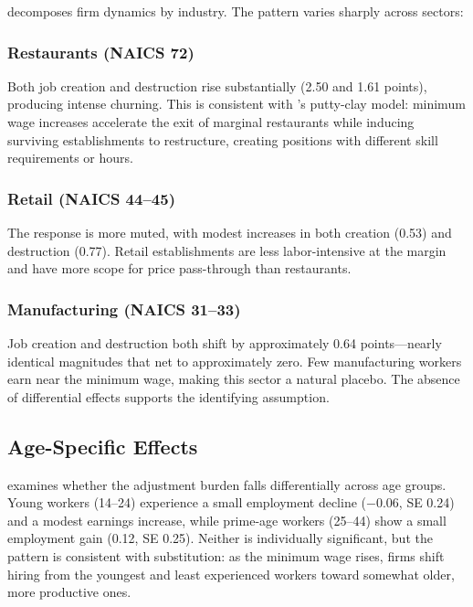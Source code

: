 \documentclass[12pt]{article}
\begin{document}


 decomposes firm dynamics by industry. The pattern varies sharply across sectors:

\subsubsection*{Restaurants (NAICS 72)} Both job creation and destruction rise substantially (2.50 and 1.61 points), producing intense churning. This is consistent with \citet{aaronson2018industry}'s putty-clay model: minimum wage increases accelerate the exit of marginal restaurants while inducing surviving establishments to restructure, creating positions with different skill requirements or hours.

\subsubsection*{Retail (NAICS 44--45)} The response is more muted, with modest increases in both creation (0.53) and destruction (0.77). Retail establishments are less labor-intensive at the margin and have more scope for price pass-through than restaurants.

\subsubsection*{Manufacturing (NAICS 31--33)} Job creation and destruction both shift by approximately 0.64 points---nearly identical magnitudes that net to approximately zero. Few manufacturing workers earn near the minimum wage, making this sector a natural placebo. The absence of differential effects supports the identifying assumption.

\subsection{Age-Specific Effects}



 examines whether the adjustment burden falls differentially across age groups. Young workers (14--24) experience a small employment decline ($-0.06$, SE 0.24) and a modest earnings increase, while prime-age workers (25--44) show a small employment gain (0.12, SE 0.25). Neither is individually significant, but the pattern is consistent with substitution: as the minimum wage rises, firms shift hiring from the youngest and least experienced workers toward somewhat older, more productive ones.
\end{document}
